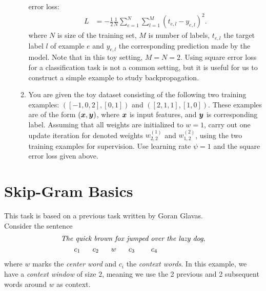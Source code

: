 \documentclass[11pt,a4paper]{article}
\begin{document}
\begin{enumerate}[label=(\alph*)]
\begin{enumerate}[label=(\roman*)]
                    error loss:
                    \begin{align*}
                        L & = -\frac{1}{2}\frac{1}{N}\sum_{e=1}^{N} \sum_{l=1}^{M} (t_{e,l}-y_{e,l})^2.
                    \end{align*}
                    where $N$ is size of the training set, $M$ is number of 
                    labels, $t_{e,l}$ the target label $l$ of example $e$ and 
                    $y_{e,l}$ the corresponding prediction made by the model.
                    Note that in this toy setting, $M = N = 2$.
                    Using square error loss for a classification task is not a
                    common setting, but it is useful for us to construct a 
                    simple example to study backpropagation.
              \item You are given the toy dataset consisting of the following 
                    two training examples: $([-1, 0, 2], [0, 1])$ and
                    $([2, 1, 1], [1, 0])$.
                    These examples are of the form $({\boldsymbol{x}}, {\boldsymbol{y}})$, where ${\boldsymbol{x}}$
                    is input features, and ${\boldsymbol{y}}$ is corresponding label.
                    Assuming that all weights are initialized to $w = 1$, carry 
                    out one update iteration for denoted weights $w^{(1)}_{2,2}$ 
                    and $w^{(2)}_{1,2}$, using the two training examples for 
                    supervision.
                    Use learning rate $\psi = 1$ and the square error 
                    loss given above.
          \end{enumerate}
\end{enumerate}

\section{Skip-Gram Basics}

This task is based on a previous task written by Goran Glavas. \\

Consider the sentence
\begin{align*}
    \textit{The quick brown fox jumped over the lazy dog}, \\
    c_1 \hspace{0.60cm}
    c_2 \hspace{0.60cm}
    w \hspace{0.60cm}
    c_3 \hspace{0.80cm}
    c_4 \hspace{2.35cm}
\end{align*}
where $w$ marks the \emph{center word} and $c_i$ the \emph{context words}.
In this example, we have a \emph{context window} of size $2$, meaning we use the
2 previous and 2 subsequent words around $w$ as context.
\end{document}
